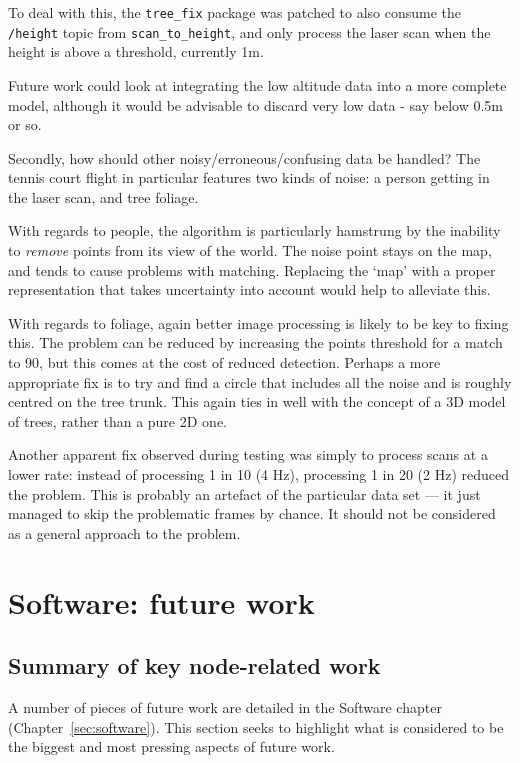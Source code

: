 \documentclass[12pt,oneside,a4paper]{book}
\begin{document}
To deal with this, the \texttt{tree\_fix} package was patched to also
consume the \texttt{/height} topic from \texttt{scan\_to\_height}, and
only process the laser scan when the height is above a threshold,
currently 1m.

Future work could look at integrating the low altitude data into a
more complete model, although it would be advisable to discard very
low data - say below 0.5m or so.

Secondly, how should other noisy/erroneous/confusing data be handled? The tennis court
flight in particular features two kinds of noise: a person getting in
the laser scan, and tree foliage.

With regards to people, the algorithm is particularly hamstrung by the
inability to \emph{remove} points from its view of the world. The
noise point stays on the map, and tends to cause problems with
matching. Replacing the `map' with a proper representation that takes
uncertainty into account would help to alleviate this.

With regards to foliage, again better image processing is likely to
be key to fixing this. The problem can be reduced by increasing the
points threshold for a match to 90, but this comes at the cost of
reduced detection. Perhaps a more appropriate fix is to try and find a
circle that includes all the noise and is roughly centred on the tree
trunk. This again ties in well with the concept of a 3D model of trees,
rather than a pure 2D one.

Another apparent fix observed during testing was simply to process
scans at a lower rate: instead of processing 1 in 10 (4 Hz),
processing 1 in 20 (2 Hz) reduced the problem. This is probably an
artefact of the particular data set --- it just managed to skip the
problematic frames by chance. It should not be considered as a
general approach to the problem.

\section{Software: future work}
\label{sec:softw-future-work}

\subsection{Summary of key node-related work}
\label{sec:summary-key-node}

A number of pieces of future work are detailed in the Software
chapter (Chapter~\ref{sec:software}). This section seeks to highlight
what is considered to be the biggest and most pressing aspects of
future work.
\end{document}
